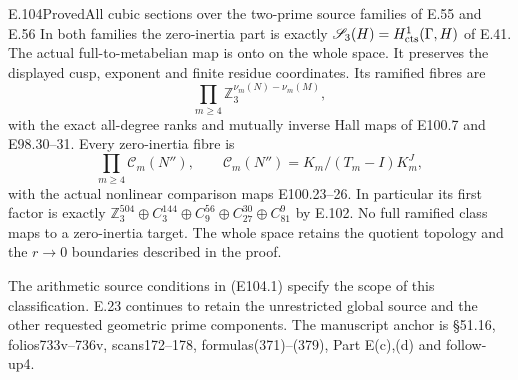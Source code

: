 \begin{statement}{E.104}{Proved}{All cubic sections over the two-prime source families of E.55 and E.56}
In both families the zero-inertia part is exactly
$\mathscr S_3(H)=H^1_{\rm cts}(\Gamma,H)$ of E.41.
The actual full-to-metabelian map is onto on the whole
space. It preserves the displayed cusp, exponent and
finite residue coordinates. Its ramified fibres are
\[
 \prod_{m\ge4}\mathbb Z_3^{\nu_m(N)-\nu_m(M)},
 \tag{E104.11}
\]
with the exact all-degree ranks and mutually inverse
Hall maps of E100.7 and E98.30--31. Every zero-inertia
fibre is
\[
 \prod_{m\ge4}\mathcal C_m(N''),\qquad
 \mathcal C_m(N'')=K_m/(T_m-I)K_m^J,
 \tag{E104.12}
\]
with the actual nonlinear comparison maps E100.23--26.
In particular its first factor is exactly
$\mathbb Z_3^{504}\oplus C_3^{144}\oplus C_9^{56}
\oplus C_{27}^{30}\oplus C_{81}^{9}$ by E.102.
No full ramified class maps to a zero-inertia target.
The whole space retains the quotient topology and
the $r\to0$ boundaries described in the proof.

The arithmetic source conditions in (E104.1) specify
the scope of this classification. E.23 continues to
retain the unrestricted global source and the other
requested geometric prime components. The manuscript
anchor is \S51.16, folios733v--736v, scans172--178,
formulas(371)--(379), Part E(c),(d) and follow-up4.
\end{statement}

